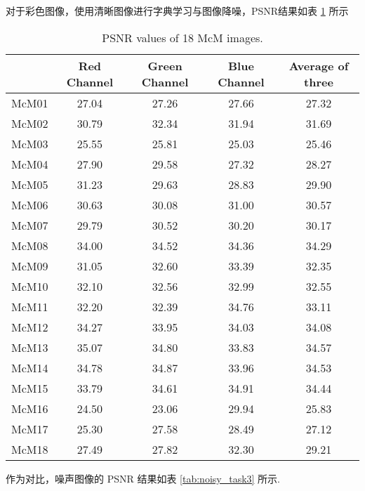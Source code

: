 \documentclass[10.5pt]{myarticle}
\begin{document}
对于彩色图像，使用清晰图像进行字典学习与图像降噪，PSNR结果如表 \ref{tab:result_task3} 所示

\begin{table}[H]
	\centering
	\caption{PSNR values of 18 McM images.}
	\label{tab:result_task3}
	\begin{tabular}{|c|c|c|c|c|}
		\hline
		 & Red Channel & Green Channel & Blue Channel & Average of three \\ \hline
		McM01 & 27.04  & 27.26  & 27.66  & 27.32  \\ \hline
		McM02 & 30.79  & 32.34  & 31.94  & 31.69  \\ \hline
		McM03 & 25.55  & 25.81  & 25.03  & 25.46  \\ \hline
		McM04 & 27.90  & 29.58  & 27.32  & 28.27  \\ \hline
		McM05 & 31.23  & 29.63  & 28.83  & 29.90  \\ \hline
		McM06 & 30.63  & 30.08  & 31.00  & 30.57  \\ \hline
		McM07 & 29.79  & 30.52  & 30.20  & 30.17  \\ \hline
		McM08 & 34.00  & 34.52  & 34.36  & 34.29  \\ \hline
		McM09 & 31.05  & 32.60  & 33.39  & 32.35  \\ \hline
		McM10 & 32.10  & 32.56  & 32.99  & 32.55  \\ \hline
		McM11 & 32.20  & 32.39  & 34.76  & 33.11  \\ \hline
		McM12 & 34.27  & 33.95  & 34.03  & 34.08  \\ \hline
		McM13 & 35.07  & 34.80  & 33.83  & 34.57  \\ \hline
		McM14 & 34.78  & 34.87  & 33.96  & 34.53  \\ \hline
		McM15 & 33.79  & 34.61  & 34.91  & 34.44  \\ \hline
		McM16 & 24.50  & 23.06  & 29.94  & 25.83  \\ \hline
		McM17 & 25.30  & 27.58  & 28.49  & 27.12  \\ \hline
		McM18 & 27.49  & 27.82  & 32.30  & 29.21  \\ \hline
	\end{tabular}
\end{table}

作为对比，噪声图像的 PSNR 结果如表 \ref{tab:noisy_task3} 所示. 
\end{document}
